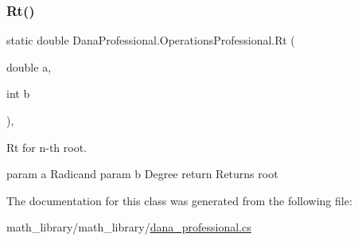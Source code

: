 \subsubsection{\texorpdfstring{Rt()}{Rt()}}
{\footnotesize\ttfamily static double Dana\+Professional.\+Operations\+Professional.\+Rt (\begin{DoxyParamCaption}\item[{double}]{a,  }\item[{int}]{b }\end{DoxyParamCaption})\hspace{0.3cm}{\ttfamily [inline]}, {\ttfamily [static]}}



Rt for n-\/th root. 

param a Radicand param b Degree return Returns root 

The documentation for this class was generated from the following file\+:\begin{DoxyCompactItemize}
\item 
math\+\_\+library/math\+\_\+library/\hyperlink{dana__professional_8cs}{dana\+\_\+professional.\+cs}\end{DoxyCompactItemize}
